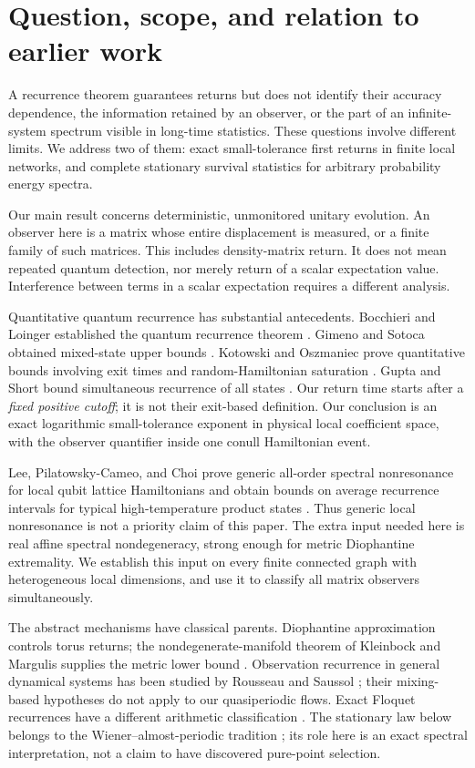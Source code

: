 \section{Question, scope, and relation to earlier work}

A recurrence theorem guarantees returns but does not identify their
accuracy dependence, the information retained by an observer, or the part
of an infinite-system spectrum visible in long-time statistics. These
questions involve different limits. We address two of them: exact
small-tolerance first returns in finite local networks, and complete
stationary survival statistics for arbitrary probability energy spectra.

Our main result concerns deterministic, unmonitored unitary evolution.
An observer here is a matrix whose entire displacement is measured, or a
finite family of such matrices. This includes density-matrix return.
It does not mean repeated quantum detection, nor merely return of a scalar
expectation value. Interference between terms in a scalar expectation
requires a different analysis.

Quantitative quantum recurrence has substantial antecedents. Bocchieri
and Loinger established the quantum recurrence theorem
\cite{BocchieriLoinger1957}. Gimeno and Sotoca obtained mixed-state upper
bounds \cite{GimenoSotoca2017}. Kotowski and Oszmaniec prove quantitative
bounds involving exit times and random-Hamiltonian saturation
\cite{KotowskiOszmaniec2026}. Gupta and Short bound simultaneous recurrence
of all states \cite{GuptaShort2026}. Our return time starts after a
\emph{fixed positive cutoff}; it is not their exit-based definition.
Our conclusion is an exact logarithmic small-tolerance exponent in physical
local coefficient space, with the observer quantifier inside one conull
Hamiltonian event.

Lee, Pilatowsky-Cameo, and Choi prove generic all-order spectral
nonresonance for local qubit lattice Hamiltonians and obtain bounds on
average recurrence intervals for typical high-temperature product states
\cite{LeePilatowskyChoi2026}. Thus generic local nonresonance is not a
priority claim of this paper. The extra input needed here is real affine
spectral nondegeneracy, strong enough for metric Diophantine extremality.
We establish this input on every finite connected graph with heterogeneous
local dimensions, and use it to classify all matrix observers
simultaneously.

The abstract mechanisms have classical parents. Diophantine approximation
controls torus returns; the nondegenerate-manifold theorem of Kleinbock
and Margulis supplies the metric lower bound \cite{KleinbockMargulis1998}.
Observation recurrence in general dynamical systems has been studied by
Rousseau and Saussol \cite{RousseauSaussol2010,Rousseau2012}; their
mixing-based hypotheses do not apply to our quasiperiodic flows.
Exact Floquet recurrences have a different arithmetic classification
\cite{AnandEtAl2026}. The stationary law below belongs to the
Wiener--almost-periodic tradition \cite{Wiener1930}; its role here is an
exact spectral interpretation, not a claim to have discovered pure-point
selection.

